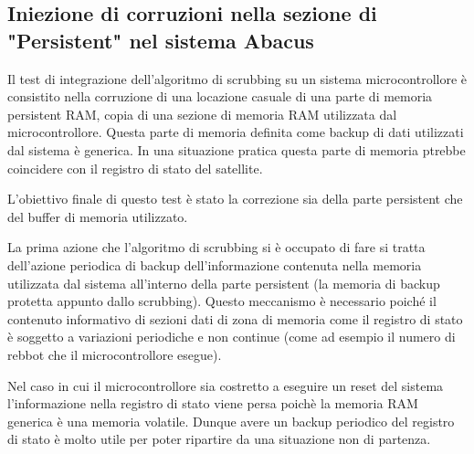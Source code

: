 \documentclass[LaM,binding=0.6cm]{../sapthesis}
\begin{document}
\subsection{Iniezione di corruzioni nella sezione di "Persistent" nel sistema Abacus}

Il test di integrazione dell'algoritmo di scrubbing su un sistema microcontrollore è consistito nella corruzione di una locazione casuale di una parte di memoria persistent RAM, copia di una sezione di memoria RAM utilizzata dal microcontrollore. 
Questa parte di memoria definita come backup di dati utilizzati dal sistema è generica. In una situazione pratica questa parte di memoria ptrebbe coincidere con il registro di stato del satellite.

L'obiettivo finale di questo test è stato la correzione sia della parte persistent che del buffer di memoria utilizzato.

La prima azione che l'algoritmo di scrubbing si è occupato di fare si tratta dell'azione periodica di backup dell'informazione contenuta nella memoria utilizzata dal sistema all'interno della parte persistent (la memoria di backup protetta appunto dallo scrubbing). Questo meccanismo è necessario poiché il contenuto informativo di sezioni dati di zona di memoria come il registro di stato è soggetto a variazioni periodiche e non continue (come ad esempio il numero di rebbot che il microcontrollore esegue). 

Nel caso in cui il microcontrollore sia costretto a eseguire un reset del sistema l'informazione nella registro di stato viene persa poichè la memoria RAM generica è una memoria volatile. Dunque avere un backup periodico del registro di stato è molto utile per poter ripartire da una situazione non di partenza.
\end{document}
